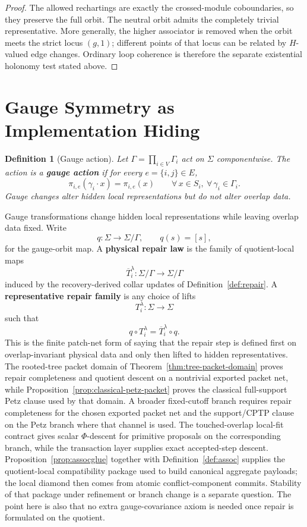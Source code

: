 \documentclass[11pt]{article}
\newtheorem{definition}[theorem]{Definition}
\theoremstyle{remark}
\theoremstyle{plain}
\begin{document}
\begin{proof}
The allowed rechartings are exactly the crossed-module coboundaries, so they preserve the full
orbit. The neutral orbit admits the completely trivial representative. More generally, the higher
associator is removed when the orbit meets the strict locus \((g,1)\); different points of that
locus can be related by \(H\)-valued edge changes. Ordinary loop coherence is therefore the
separate existential holonomy test stated above.
\end{proof}


\section{Gauge Symmetry as Implementation Hiding}

\begin{definition}[Gauge action]\label{def:gauge}
Let $\Gamma = \prod_{i\in V}\Gamma_i$ act on $\Sigma$ componentwise. The action is a \textbf{gauge action} if for every $e=\{i,j\}\in E$,
\[
\pi_{i,e}(\gamma_i\cdot x)=\pi_{i,e}(x)
\qquad
\forall\, x\in S_i,\ \forall\, \gamma_i\in \Gamma_i.
\]
Gauge changes alter hidden local representations but do not alter overlap data.
\end{definition}

Gauge transformations change hidden local representations while leaving overlap data fixed. Write
\[
q:\Sigma\to \Sigma/\Gamma,
\qquad
q(s)=[s],
\]
for the gauge-orbit map. A \textbf{physical repair law} is the family of quotient-local maps
\[
\overline T_i^\lambda:\Sigma/\Gamma\to \Sigma/\Gamma
\]
induced by the recovery-derived collar updates of Definition~\ref{def:repair}. A
\textbf{representative repair family} is any choice of lifts
\[
T_i^\lambda:\Sigma\to\Sigma
\]
such that
\[
q\circ T_i^\lambda
=
\overline T_i^\lambda\circ q.
\]
This is the finite patch-net form of saying that the repair step is defined first on
overlap-invariant physical data and only then lifted to hidden representatives. The rooted-tree
packet domain of Theorem~\ref{thm:tree-packet-domain} proves repair completeness and quotient
descent on a nontrivial exported packet net, while Proposition~\ref{prop:classical-petz-packet}
proves the classical full-support Petz clause used by that domain. A broader fixed-cutoff
branch requires repair completeness for the chosen exported packet net and the
support/CPTP clause on the Petz branch where that channel is used. The touched-overlap local-fit
contract gives scalar \(\Phi\)-descent for primitive proposals on the corresponding branch, while
the transaction layer supplies exact accepted-step descent. Proposition~\ref{prop:assocglue}
together with Definition~\ref{def:assoc} supplies the quotient-local compatibility package used
to build canonical aggregate payloads; the local diamond then comes from atomic conflict-component
commits. Stability of that package under refinement or branch change is a separate question.
The point here is also that no extra gauge-covariance axiom is needed once repair is formulated
on the quotient.
\end{document}
